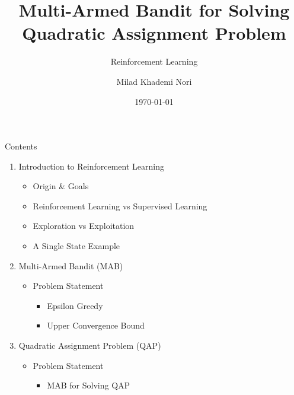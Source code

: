 \documentclass{beamer}
\title[Reinforcement Learning]{Multi-Armed Bandit for Solving Quadratic Assignment Problem}
\subtitle{Reinforcement Learning}
\author{Milad Khademi Nori}
\date{\today}
\begin{document}
\begin{frame}
\titlepage
\end{frame}


\begin{frame}[t]{Contents} %
\begin{enumerate}
\item Introduction to Reinforcement Learning
		\begin{itemize}
		\item Origin \& Goals		
		\item Reinforcement Learning vs Supervised Learning		
		\item Exploration vs Exploitation		
		\item A Single State Example
		\end{itemize}		
\item Multi-Armed Bandit (MAB)
		\begin{itemize}		
		\item Problem Statement
			\begin{itemize}
			\item Epsilon Greedy		
			\item Upper Convergence Bound
			\end{itemize}
		\end{itemize}		
\item Quadratic Assignment Problem (QAP)
		\begin{itemize}
		\item Problem Statement		
			\begin{itemize}		
			\item MAB for Solving QAP			
			\end{itemize}
		\end{itemize}
\end{enumerate}
\end{frame}
\end{document}
